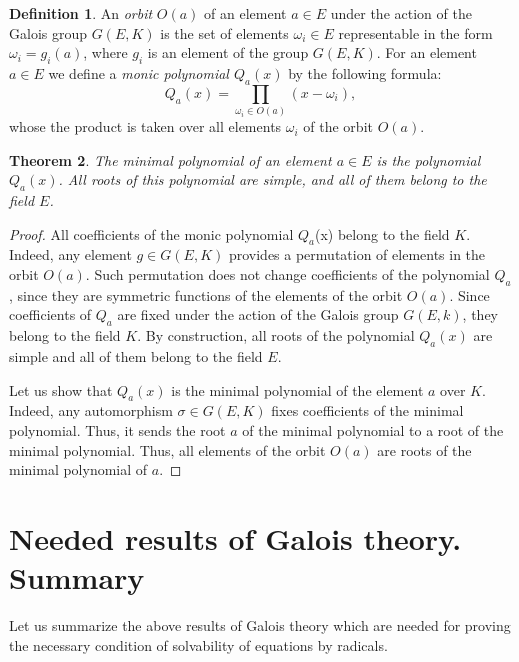 \documentclass[11pt]{article}
\theoremstyle{plain}
\newtheorem{theorem}{Theorem}[section]
\theoremstyle{definition}
\newtheorem{definition}[theorem]{Definition}
\begin{document}
\begin{definition} An {\it  orbit}  $O(a)$  of an element $a\in  E$ under the action of the Galois group $G(E,K)$ is the set of elements $\omega_i\in E$ representable in the form $\omega_i  = g_i(a)$, where $g_i$ is an element of the group $G(E,K)$. For an element $a\in E$ we define a {\it monic polynomial $Q_a(x)$} by the following formula:
\begin{equation}\label{formula}
Q_a(x)= \prod_{\omega_i\in O(a)}(x-\omega_i),
\end{equation}
whose the product is taken over all elements  $\omega_i$ of  the orbit $O(a)$.
\end{definition}

\begin{theorem} \label{alsep} The minimal polynomial of an element $a\in E$ is the polynomial $Q_a(x)$. All roots of this polynomial are simple, and all of them belong to the field $E$.
 \end{theorem}

\begin{proof} All coefficients of the monic   polynomial
$Q_a$(x) belong to the field $K$.  Indeed, any element $g\in G(E,K)$ provides a permutation of elements  in the orbit $O(a)$. Such permutation  does not change  coefficients of the polynomial $Q_a$, since they  are symmetric functions of the elements of the orbit $O(a)$. Since  coefficients of $Q_a$ are fixed under the action of the Galois group $G(E,k)$, they belong to the field $K$. By construction, all roots of the polynomial $Q_a(x)$ are simple and all of them  belong to the field $E$.

Let us show that $Q_a(x)$ is the minimal polynomial of the element $a$ over $K$. Indeed, any automorphism $\sigma\in G(E,K)$ fixes coefficients of the minimal polynomial. Thus, it sends the  root $a$ of the minimal polynomial to a root of the minimal polynomial. Thus, all elements of the orbit $O(a)$ are  roots of the minimal polynomial of $a$.

\end{proof}


 \section{Needed results of Galois theory. Summary }

Let us summarize the above results of Galois theory which are needed for proving the necessary condition of solvability of equations by radicals.
\end{document}
